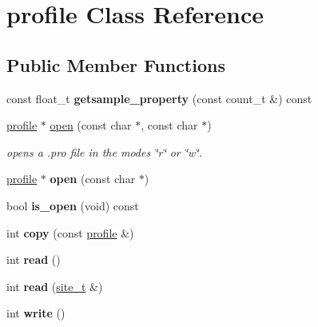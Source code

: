 \hypertarget{classprofile}{\section{profile Class Reference}
\label{classprofile}
}
\subsection*{Public Member Functions}
\begin{DoxyCompactItemize}
\item 
\hypertarget{classprofile_a139d96163dc596a2b3d472aca45c97c3}{const float\-\_\-t {\bfseries getsample\-\_\-property} (const count\-\_\-t \&) const }\label{classprofile_a139d96163dc596a2b3d472aca45c97c3}

\item 
\hyperlink{classprofile}{profile} $\ast$ \hyperlink{classprofile_a50ea49f3b293f621848fb2375cd1eaa6}{open} (const char $\ast$, const char $\ast$)
\begin{DoxyCompactList}\small\item\em opens a .pro file in the modes \char`\"{}r\char`\"{} or \char`\"{}w\char`\"{}. \end{DoxyCompactList}\item 
\hypertarget{classprofile_a2639e97ce5a52824c83e2071ba0fb7ee}{\hyperlink{classprofile}{profile} $\ast$ {\bfseries open} (const char $\ast$)}\label{classprofile_a2639e97ce5a52824c83e2071ba0fb7ee}

\item 
\hypertarget{classprofile_a5a6e4ce6f7cca8d0e0e9c40ad855eea7}{bool {\bfseries is\-\_\-open} (void) const }\label{classprofile_a5a6e4ce6f7cca8d0e0e9c40ad855eea7}

\item 
\hypertarget{classprofile_a36ce56a84e7800c1fbcaf75ad8d066f6}{int {\bfseries copy} (const \hyperlink{classprofile}{profile} \&)}\label{classprofile_a36ce56a84e7800c1fbcaf75ad8d066f6}

\item 
\hypertarget{classprofile_a252b01056cdfefe54c265a6e77f9c82b}{int {\bfseries read} ()}\label{classprofile_a252b01056cdfefe54c265a6e77f9c82b}

\item 
\hypertarget{classprofile_acfcd0c47bba6886489582bc8e872664a}{int {\bfseries read} (\hyperlink{classsite__t}{site\-\_\-t} \&)}\label{classprofile_acfcd0c47bba6886489582bc8e872664a}

\item 
\hypertarget{classprofile_a7dce10bed6159f785041a9b4b0099e47}{int {\bfseries write} ()}\label{classprofile_a7dce10bed6159f785041a9b4b0099e47}


\end{DoxyCompactItemize}
